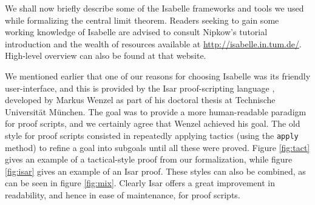 \documentclass{article}
\theoremstyle{definition}
\begin{document}
We shall now briefly describe some of the Isabelle frameworks and tools we used while formalizing the central limit theorem. Readers seeking to gain some working knowledge of Isabelle are advised to consult Nipkow's tutorial introduction \cite{nipkow-prog-prove} and the wealth of resources available at \url{http://isabelle.in.tum.de/}. High-level overview can also be found at that website.

We mentioned earlier that one of our reasons for choosing Isabelle was its friendly user-interface, and this is provided by the Isar proof-scripting language \cite{wenzel-isar}, developed by Markus Wenzel as part of his doctoral thesis at Technische Universit\"at M\"unchen. The goal was to provide a more human-readable paradigm for proof scripts, and we certainly agree that Wenzel achieved his goal. The old style for proof scripts consisted in repeatedly applying tactics (using the \texttt{apply} method) to refine a goal into subgoals until all these were proved. Figure \ref{fig:tact} gives an example of a tactical-style proof from our formalization, while figure \ref{fig:isar} gives an example of an Isar proof. These styles can also be combined, as can be seen in figure \ref{fig:mix}. Clearly Isar offers a great improvement in readability, and hence in ease of maintenance, for proof scripts.
\end{document}
